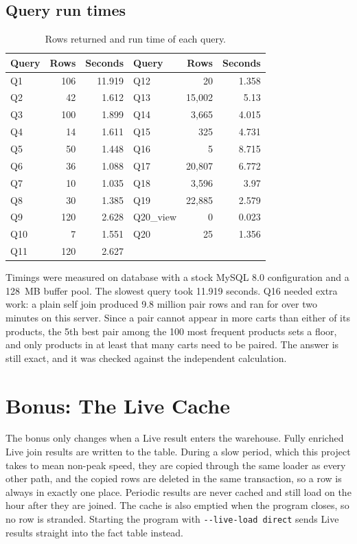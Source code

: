\documentclass[11pt,a4paper]{article}
\newcommand{\code}[1]{\texttt{\detokenize{#1}}}
\begin{document}
\subsection{Query run times}

\begin{table}[ht]\centering
\caption{Rows returned and run time of each query.}
\begin{tabular}{lrrlrr}
\toprule \textbf{Query} & \textbf{Rows} & \textbf{Seconds} & \textbf{Query} & \textbf{Rows} & \textbf{Seconds} \\ \midrule
Q1 & 106 & 11.919 & Q12 & 20 & 1.358 \\
Q2 & 42 & 1.612 & Q13 & 15,002 & 5.13 \\
Q3 & 100 & 1.899 & Q14 & 3,665 & 4.015 \\
Q4 & 14 & 1.611 & Q15 & 325 & 4.731 \\
Q5 & 50 & 1.448 & Q16 & 5 & 8.715 \\
Q6 & 36 & 1.088 & Q17 & 20,807 & 6.772 \\
Q7 & 10 & 1.035 & Q18 & 3,596 & 3.97 \\
Q8 & 30 & 1.385 & Q19 & 22,885 & 2.579 \\
Q9 & 120 & 2.628 & Q20\_view & 0 & 0.023 \\
Q10 & 7 & 1.551 & Q20 & 25 & 1.356 \\
Q11 & 120 & 2.627 &  &  &  \\
\bottomrule\end{tabular}
\end{table}

Timings were measured on database \code{retail_dw} with a stock MySQL 8.0 configuration and a 128~MB buffer pool. The slowest query took 11.919 seconds. Q16 needed extra work: a plain self join produced 9.8 million pair rows and ran for over two minutes on this server. Since a pair cannot appear in more carts than either of its products, the 5th best pair among the 100 most frequent products sets a floor, and only products in at least that many carts need to be paired. The answer is still exact, and it was checked against the independent calculation.

\section{Bonus: The Live Cache}

The bonus only changes when a Live result enters the warehouse. Fully enriched Live join results are written to the \code{live_cache} table. During a slow period, which this project takes to mean non-peak speed, they are copied through the same loader as every other path, and the copied rows are deleted in the same transaction, so a row is always in exactly one place. Periodic results are never cached and still load on the hour after they are joined. The cache is also emptied when the program closes, so no row is stranded. Starting the program with \texttt{-{}-live-load direct} sends Live results straight into the fact table instead.
\end{document}

